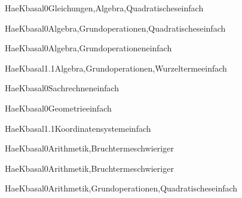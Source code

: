 \documentclass[12pt]{article}
\begin{document}
\begin{Add}{HaeK}{basal0}{Gleichungen,Algebra,Quadratisches}{einfach}
      
\end{Add}

\begin{Add}{HaeK}{basal0}{Algebra,Grundoperationen,Quadratisches}{einfach}
\end{Add}

\begin{Add}{HaeK}{basal0}{Algebra,Grundoperationen}{einfach}
\end{Add}

\begin{Add}{HaeK}{basal1.1}{Algebra,Grundoperationen,Wurzelterme}{einfach}
\end{Add}

\begin{Add}{HaeK}{basal0}{Sachrechnen}{einfach}
\end{Add}

\begin{Add}{HaeK}{basal0}{Geometrie}{einfach}
\end{Add}

\begin{Add}{HaeK}{basal1.1}{Koordinatensystem}{einfach}
\end{Add}

\begin{Add}{HaeK}{basal0}{Arithmetik,Bruchterme}{schwieriger}
\end{Add}

\begin{Add}{HaeK}{basal0}{Arithmetik,Bruchterme}{schwieriger}
\end{Add}

\begin{Add}{HaeK}{basal0}{Arithmetik,Grundoperationen,Quadratisches}{einfach}
\end{Add}
\end{document}
